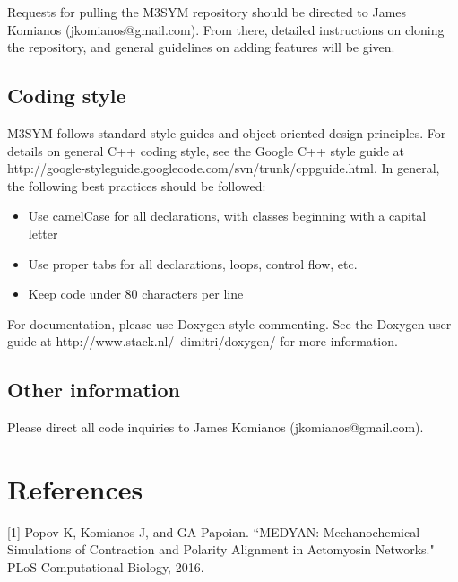\documentclass[11pt, oneside]{article}   	%
\begin{document}
Requests for pulling the M3SYM repository should be directed to James Komianos (jkomianos@gmail.com). From there, detailed instructions on cloning the repository, and general guidelines on adding features will be given.

\subsection{Coding style}

M3SYM follows standard style guides and object-oriented design principles. For details on general C++ coding style, see the Google C++ style guide at http://google-styleguide.googlecode.com/svn/trunk/cppguide.html. In general, the following best practices should be followed:

\begin{itemize}

\item Use camelCase for all declarations, with classes beginning with a capital letter
\item Use proper tabs for all declarations, loops, control flow, etc.
\item Keep code under 80 characters per line

\end{itemize}

\noindent For documentation, please use Doxygen-style commenting. See the Doxygen user guide at 
http://www.stack.nl/~dimitri/doxygen/ for more information.

\subsection{Other information}

Please direct all code inquiries to James Komianos (jkomianos@gmail.com).

\section{References}

[1] Popov K, Komianos J, and GA Papoian. ``MEDYAN: Mechanochemical Simulations 
\indent of Contraction and Polarity Alignment in Actomyosin Networks." PLoS Computational \indent Biology, 2016.
\end{document}
